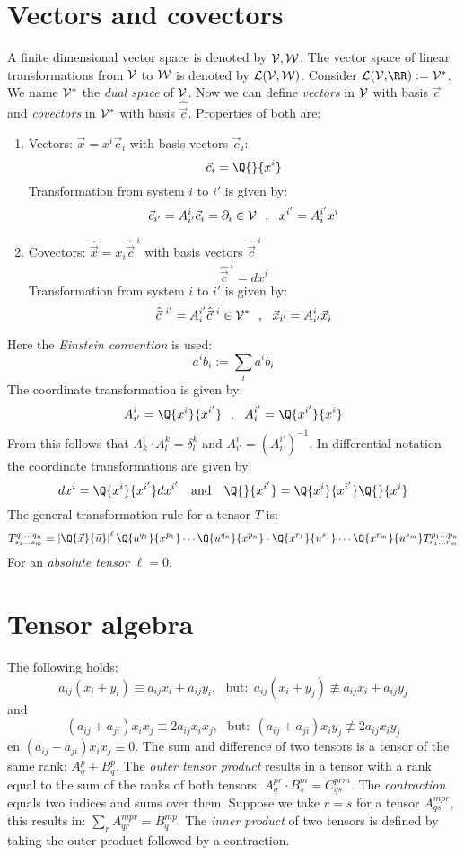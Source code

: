 \section{Vectors and covectors}
A finite dimensional vector space is denoted by $\cal V, W$. The vector
space of linear transformations from $\cal V$ to $\cal W$ is denoted by
$\cal L(V,W)$. Consider ${\cal L(V,}\RR):={\cal V}^*$. We name $\cal V^*$ the
{\it dual space} of $\cal V$. Now we can define {\it vectors} in $\cal V$ with
basis $\vec{c}$ and {\it covectors} in $\cal V^*$ with basis $\hat{\vec{c}}$.
Properties of both are:
\begin{enumerate}
\item Vectors: $\vec{x}=x^i\vec{c}_i$ with basis vectors $\vec{c}_i$:
      \[
      \vec{c}_i=\Q{}{x^i}
      \]
      Transformation from system $i$ to $i'$ is given by:
      \[
      \vec{c}_{i'}=A_{i'}^i\vec{c}_i=\partial_i\in{\cal V}~~,~~x^{i'}=A_i^{i'}x^i
      \]
\item Covectors: $\hat{\vec{x}}=x_i\hat{\vec{c}}^{~i}$ with basis vectors $\hat{\vec{c}}^{~i}$
      \[
      \hat{\vec{c}}^{~i}=dx^i
      \]
      Transformation from system $i$ to $i'$ is given by:
      \[
      \hat{\vec{c}}^{~i'}=A_i^{i'}\hat{\vec{c}}^{~i}\in{\cal V}^*~~,~~\vec{x}_{i'}=A_{i'}^i\vec{x}_i
      \]
\end{enumerate}
Here the {\it Einstein convention} is used:
\[
a^ib_i:=\sum_ia^ib_i
\]
The coordinate transformation is given by:
\[
A_{i'}^i=\Q{x^i}{x^{i'}}~~,~~A_i^{i'}=\Q{x^{i'}}{x^i}
\]
From this follows that $A_k^i\cdot A_l^k=\delta_l^k$ and $A_{i'}^i=(A_i^{i'})^{-1}$.
\npar
In differential notation the coordinate transformations are given by:
\[
dx^i=\Q{x^i}{x^{i'}}dx^{i'}~~~\mbox{and}~~~\Q{}{x^{i'}}=\Q{x^i}{x^{i'}}\Q{}{x^i}
\]
The general transformation rule for a tensor $T$ is:
\[
T_{s_1...s_m}^{q_1...q_n}=\left|\Q{\vec{x}}{\vec{u}}\right|^\ell
\Q{u^{q_1}}{x^{p_1}}\cdots\Q{u^{q_n}}{x^{p_n}}\cdot\Q{x^{r_1}}{u^{s_1}}\cdots\Q{x^{r_m}}{u^{s_m}}T_{r_1...r_m}^{p_1...p_n}
\]
For an {\it absolute tensor} $\ell=0$.

\section{Tensor algebra}
The following holds:
\[
a_{ij}(x_i+y_i)\equiv a_{ij}x_i+a_{ij}y_i,~~~\mbox{but:}~~a_{ij}(x_i+y_j)\not\equiv a_{ij}x_i+a_{ij}y_j
\]
and
\[
(a_{ij}+a_{ji})x_ix_j\equiv2a_{ij}x_ix_j,~~~\mbox{but:}~~(a_{ij}+a_{ji})x_iy_j\not\equiv 2a_{ij}x_iy_j
\]
en $(a_{ij}-a_{ji})x_ix_j\equiv0$.
\npar
The sum and difference of two tensors is a tensor of the same rank:
$A_q^p\pm B_q^p$. The {\it outer tensor product} results in a tensor with a
rank equal to the sum of the ranks of both tensors:
$A_q^{pr}\cdot B_s^m=C_{qs}^{prm}$. The {\it contraction} equals two indices
and sums over them. Suppose we take $r=s$ for a tensor $A_{qs}^{mpr}$, this
results in: $\sum\limits_r A_{qr}^{mpr}=B_q^{mp}$. The
{\it inner product} of two tensors is defined by taking the outer product
followed by a contraction.

